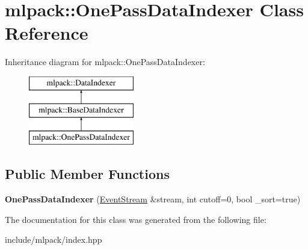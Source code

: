 \hypertarget{classmlpack_1_1_one_pass_data_indexer}{
\section{mlpack::OnePassDataIndexer Class Reference}
\label{classmlpack_1_1_one_pass_data_indexer}
}
Inheritance diagram for mlpack::OnePassDataIndexer:\begin{figure}[H]
\begin{center}
\leavevmode
\includegraphics[height=3.000000cm]{classmlpack_1_1_one_pass_data_indexer}
\end{center}
\end{figure}
\subsection*{Public Member Functions}
\begin{DoxyCompactItemize}
\item 
\hypertarget{classmlpack_1_1_one_pass_data_indexer_a8e9d977e6781271f9f7ca0da2ce1bbd3}{
{\bfseries OnePassDataIndexer} (\hyperlink{classmlpack_1_1_event_stream}{EventStream} \&stream, int cutoff=0, bool \_\-sort=true)}
\label{classmlpack_1_1_one_pass_data_indexer_a8e9d977e6781271f9f7ca0da2ce1bbd3}

\end{DoxyCompactItemize}


The documentation for this class was generated from the following file:\begin{DoxyCompactItemize}
\item 
include/mlpack/index.hpp\end{DoxyCompactItemize}
